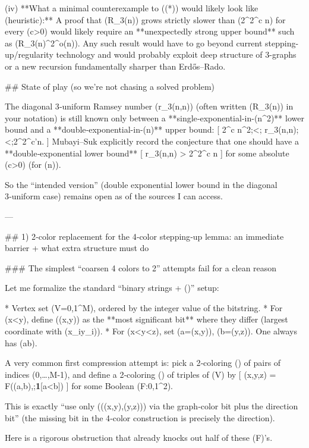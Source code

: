 (iv) **What a minimal counterexample to ((*)) would likely look like (heuristic):**
A proof that (R_3(n)) grows strictly slower than (2^{2^{c n}}) for every (c>0) would likely require an **unexpectedly strong upper bound** such as (R_3(n)^{2^{o(n)}}). Any such result would have to go beyond current stepping-up/regularity technology and would probably exploit deep structure of 3-graphs or a new recursion fundamentally sharper than Erdős–Rado.


## State of play (so we’re not chasing a solved problem)

The diagonal 3‑uniform Ramsey number (r_3(n,n)) (often written (R_3(n)) in your notation) is still known only between a **single‑exponential-in-(n^2)** lower bound and a **double‑exponential-in-(n)** upper bound:
[
2^{c n^2};<; r_3(n,n);<;2^{2^{c'n}}.
]
Mubayi–Suk explicitly record the conjecture that one should have a **double‑exponential lower bound**
[
r_3(n,n) > 2^{2^{c n}}
]
for some absolute (c>0) (for (n)). 

So the “intended version” (double exponential lower bound in the diagonal 3‑uniform case) remains open as of the sources I can access.

---

## 1) 2‑color replacement for the 4‑color stepping‑up lemma: an immediate barrier + what extra structure must do

### The simplest “coarsen 4 colors to 2” attempts fail for a clean reason

Let me formalize the standard “binary strings + (\delta)” setup:

* Vertex set (V={0,1}^M), ordered by the integer value of the bitstring.
* For (x<y), define (\delta(x,y)) as the **most significant bit** where they differ (largest coordinate with (x_i\neq y_i)).
* For (x<y<z), set (a=\delta(x,y)), (b=\delta(y,z)). One always has (a\neq b).

A very common first compression attempt is: pick a 2‑coloring (\phi) of pairs of indices ({0,\dots,M-1}), and define a 2‑coloring (\chi) of triples of (V) by
[
\chi(x,y,z) = F\big(\phi({a,b}),;{\bf 1}[a<b]\big)
]
for some Boolean (F:{0,1}^2).

This is exactly “use only ((\delta(x,y),\delta(y,z))) via the graph‑color bit plus the direction bit” (the missing bit in the 4‑color construction is precisely the direction).

Here is a rigorous obstruction that already knocks out half of these (F)’s.

